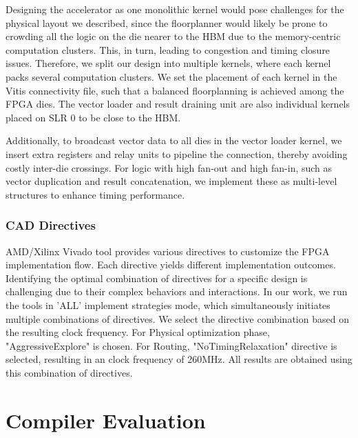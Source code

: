 \documentclass[manuscript,screen,review]{acmart}
\begin{document}
Designing the accelerator as one monolithic kernel would pose challenges for the physical layout we described, since the floorplanner would likely be prone to crowding all the logic on the die nearer to the HBM due to the memory-centric computation clusters. This, in turn, leading to congestion and timing closure issues. Therefore, we split our design into multiple kernels, where each kernel packs several computation clusters. We set the placement of each kernel in the Vitis connectivity file, such that a balanced floorplanning is achieved among the FPGA dies. The vector loader and result draining unit are also individual kernels placed on SLR 0 to be close to the HBM.

Additionally, to broadcast vector data to all dies in the vector loader kernel, we insert extra registers and relay units to pipeline the connection, thereby avoiding costly inter-die crossings. For logic with high fan-out and high fan-in, such as vector duplication and result concatenation, we implement these as multi-level structures to enhance timing performance.


\subsubsection{CAD Directives}

AMD/Xilinx Vivado tool provides various directives to customize the FPGA implementation flow. Each directive yields different implementation outcomes. Identifying the optimal combination of directives for a specific design is challenging due to their complex behaviors and interactions. In our work, we run the tools in 'ALL' implement strategies mode, which simultaneously initiates multiple combinations of directives. We select the directive combination based on the resulting clock frequency. For Physical optimization phase, "AggressiveExplore" is chosen. For Routing, "NoTimingRelaxation" directive is selected, resulting in an clock frequency of 260MHz. All results are obtained using this combination of directives.



\section{Compiler Evaluation}
\end{document}
